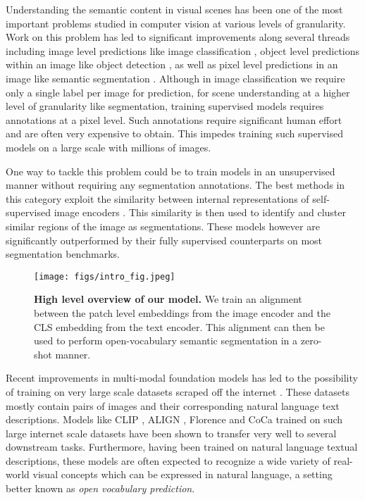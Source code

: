 \documentclass[10pt,twocolumn,letterpaper]{article}
\begin{document}
Understanding the semantic content in visual scenes has been one of the most important problems studied in computer vision at various levels of granularity. Work on this problem has led to significant improvements along several threads including image level predictions like image classification \cite{yu2022coca, wortsman2022model, dai2021coatnet}, object level predictions within an image like object detection  \cite{wei2022contrastive, wang2022image, zhang2022dino, liu2022swin, yuan2021florence, zhang2022glipv2}, as well as pixel level predictions in an image like semantic segmentation \cite{wang2022image, wei2022contrastive, li2022mask, chen2022vision}. Although in image classification we require only a single label per image for prediction, for scene understanding at a higher level of granularity like segmentation, training supervised models requires annotations at a pixel level. Such annotations require significant human effort and are often very expensive to obtain. This impedes training such supervised models on a large scale with millions of images.

One way to tackle this problem could be to train models in an unsupervised manner without requiring any segmentation annotations. The best methods \cite{cho2021picie, hamilton2022unsupervised} in this category exploit the similarity between internal representations of self-supervised image encoders \cite{caron2021emerging}. This similarity is then used to identify and cluster similar regions of the image as segmentations. These models however are significantly outperformed by their fully supervised counterparts on most segmentation benchmarks.

\begin{figure}[!t]
\centering
    \texttt{[image: figs/intro\_fig.jpeg]}
    \caption{\textbf{High level overview of our model.} We train an alignment between the patch level embeddings from the image encoder and the CLS embedding from the text encoder. This alignment can then be used to perform open-vocabulary semantic segmentation in a zero-shot manner.}
    \vspace{-4mm}
    \label{fig:intro_fig}
\end{figure}

Recent improvements in multi-modal foundation models has led to the possibility of training on very large scale datasets scraped off the internet \cite{radford2021learning}. These datasets mostly contain pairs of images and their corresponding natural language text descriptions. Models like CLIP \cite{radford2021learning}, ALIGN \cite{jia2021scaling}, Florence \cite{yuan2021florence} and CoCa \cite{yu2022coca} trained on such large internet scale datasets have been shown to transfer very well to several downstream tasks. Furthermore, having been trained on natural language textual descriptions, these models are often expected to recognize a wide variety of real-world visual concepts which can be expressed in natural language, a setting better known as \emph{open vocabulary prediction}.
\end{document}
